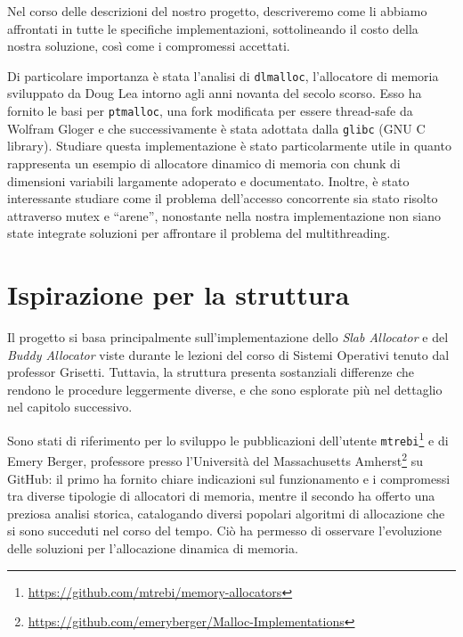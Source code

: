 Nel corso delle descrizioni del nostro progetto, descriveremo come li abbiamo affrontati in tutte le specifiche implementazioni, sottolineando il costo della nostra soluzione, così come i compromessi accettati.

Di particolare importanza è stata l’analisi di \texttt{dlmalloc}, l’allocatore di memoria sviluppato da Doug Lea intorno agli anni novanta del secolo scorso. Esso ha fornito le basi per \texttt{ptmalloc}, una fork modificata per essere thread-safe da Wolfram Gloger e che successivamente è stata adottata dalla \texttt{glibc} (GNU C library). Studiare questa implementazione è stato particolarmente utile in quanto rappresenta un esempio di allocatore dinamico di memoria con chunk di dimensioni variabili largamente adoperato e documentato. Inoltre, è stato interessante studiare come il problema dell’accesso concorrente sia stato risolto attraverso mutex e ``arene'', nonostante nella nostra implementazione non siano state integrate soluzioni per affrontare il problema del multithreading.

\section{Ispirazione per la struttura}

Il progetto si basa principalmente sull’implementazione dello \textit{Slab Allocator} e del \textit{Buddy Allocator} viste durante le lezioni del corso di Sistemi Operativi tenuto dal professor Grisetti. Tuttavia, la struttura presenta sostanziali differenze che rendono le procedure leggermente diverse, e che sono esplorate più nel dettaglio nel capitolo successivo.

Sono stati di riferimento per lo sviluppo le pubblicazioni dell’utente \texttt{mtrebi}\footnote{\url{https://github.com/mtrebi/memory-allocators}} e di Emery Berger, professore presso l’Università del Massachusetts Amherst\footnote{\url{https://github.com/emeryberger/Malloc-Implementations}} su GitHub: il primo ha fornito chiare indicazioni sul funzionamento e i compromessi tra diverse tipologie di allocatori di memoria, mentre il secondo ha offerto una preziosa analisi storica, catalogando diversi popolari algoritmi di allocazione che si sono succeduti nel corso del tempo. Ciò ha permesso di osservare l’evoluzione delle soluzioni per l’allocazione dinamica di memoria.
